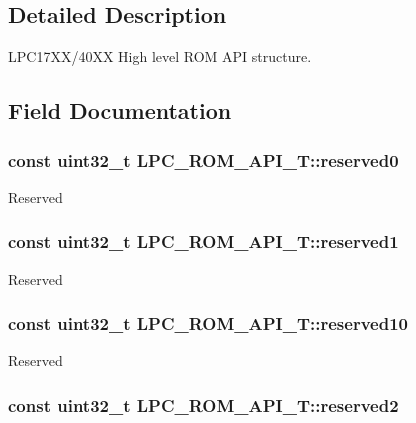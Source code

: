 \subsection{Detailed Description}
L\-P\-C17\-X\-X/40\-X\-X High level R\-O\-M A\-P\-I structure. 

\subsection{Field Documentation}
\hypertarget{structLPC__ROM__API__T_a93487c5be9000ba3b633bd6c354f8589}{
\subsubsection[{reserved0}]{\setlength{\rightskip}{0pt plus 5cm}const uint32\-\_\-t L\-P\-C\-\_\-\-R\-O\-M\-\_\-\-A\-P\-I\-\_\-\-T\-::reserved0}}\label{structLPC__ROM__API__T_a93487c5be9000ba3b633bd6c354f8589}
Reserved \hypertarget{structLPC__ROM__API__T_a2fce9202473b5986d54262b3d5548e82}{
\subsubsection[{reserved1}]{\setlength{\rightskip}{0pt plus 5cm}const uint32\-\_\-t L\-P\-C\-\_\-\-R\-O\-M\-\_\-\-A\-P\-I\-\_\-\-T\-::reserved1}}\label{structLPC__ROM__API__T_a2fce9202473b5986d54262b3d5548e82}
Reserved \hypertarget{structLPC__ROM__API__T_afb1226faead704ffe1e0c7c5efcb86f2}{
\subsubsection[{reserved10}]{\setlength{\rightskip}{0pt plus 5cm}const uint32\-\_\-t L\-P\-C\-\_\-\-R\-O\-M\-\_\-\-A\-P\-I\-\_\-\-T\-::reserved10}}\label{structLPC__ROM__API__T_afb1226faead704ffe1e0c7c5efcb86f2}
Reserved \hypertarget{structLPC__ROM__API__T_a0ab9f56adf03f0f69b04baa60bcc271a}{
\subsubsection[{reserved2}]{\setlength{\rightskip}{0pt plus 5cm}const uint32\-\_\-t L\-P\-C\-\_\-\-R\-O\-M\-\_\-\-A\-P\-I\-\_\-\-T\-::reserved2}}\label{structLPC__ROM__API__T_a0ab9f56adf03f0f69b04baa60bcc271a}
